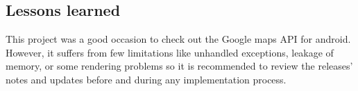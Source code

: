 \documentclass[10pt,a4paper]{article} %
\begin{document}
	\subsection{Lessons learned}

	This project was a good occasion to check out the Google maps API for android. However, it suffers from few limitations like unhandled exceptions, leakage of memory, or some rendering problems so it is recommended to review  the releases’ notes and updates before and during any implementation process.

    
    
    
    \nocite{*}
    
    
    

    
    
    
    
\end{document}
